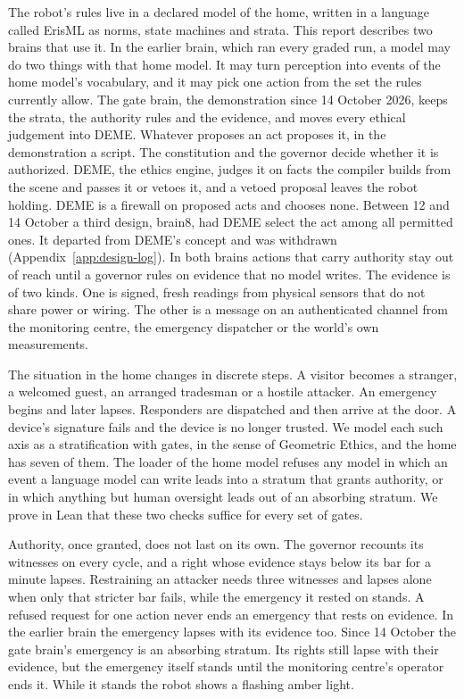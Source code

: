 The robot's rules live in a declared model of the home, written in a language called ErisML as
norms, state machines and strata. This report describes two brains that use it. In the earlier
brain, which ran every graded run, a model may do two things with that home model. It may turn
perception into events of the home model's vocabulary, and it may pick one action from the set the
rules currently allow. The gate brain, the demonstration since 14 October 2026, keeps the strata,
the authority rules and the evidence, and moves every ethical judgement into DEME. Whatever proposes
an act proposes it, in the demonstration a script. The constitution and the governor decide whether
it is authorized. DEME, the ethics engine, judges it on facts the compiler builds from the scene
and passes it or vetoes it, and a vetoed proposal leaves the robot holding. DEME is a firewall on
proposed acts and chooses none. Between 12 and 14 October a third design, brain8, had DEME select
the act among all permitted ones. It departed from DEME's concept and was withdrawn
(Appendix~\ref{app:design-log}).
In both brains actions that carry authority stay out of reach until a governor rules on evidence
that no model writes. The evidence is of
two kinds. One is signed, fresh readings from physical sensors that do not share power or
wiring. The other is a message on an authenticated channel from the monitoring centre, the
emergency dispatcher or the world's own measurements.

The situation in the home changes in discrete steps. A visitor becomes a stranger, a welcomed
guest, an arranged tradesman or a hostile attacker. An emergency begins and later lapses.
Responders are dispatched and then arrive at the door. A device's signature fails and the device
is no longer trusted. We model each such axis as a stratification with gates, in the sense of
Geometric Ethics, and the home has seven of them. The loader of the home model refuses any model
in which an event a language model can write leads into a stratum that grants authority, or in
which anything but human oversight leads out of an absorbing stratum. We prove in Lean that these
two checks suffice for every set of gates.

Authority, once granted, does not last on its own. The governor recounts its witnesses on every
cycle, and a right whose evidence stays below its bar for a minute lapses. Restraining an
attacker needs three witnesses and lapses alone when only that stricter bar fails, while the
emergency it rested on stands. A refused request for one action never ends an emergency that
rests on evidence. In the earlier brain the emergency lapses with its evidence too. Since 14
October the gate brain's emergency is an absorbing stratum. Its rights still lapse with their
evidence, but the emergency itself stands until the monitoring centre's operator ends it. While
it stands the robot shows a flashing amber light.

